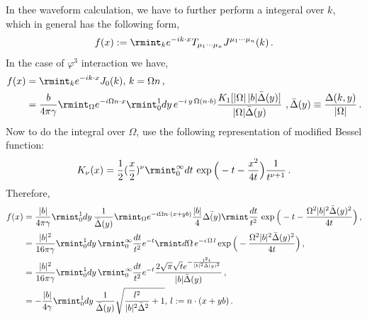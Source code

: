 In thee waveform calculation, we have to further  perform a integeral over $k$, which in general has the following form,
\begin{align}
    \begin{split}
        f(x):=\rmint_{k}e^{-ik\cdot x}T_{\mu_1\cdots \mu_n}J^{\mu_1\cdots \mu_n}(k)\,.
    \end{split}
\end{align}
In the case of $\varphi^3$ interaction we have,
\begin{align}
    \begin{split}
        f(x)&=\rmint_{k}e^{-ik\cdot x}J_{0}(k), \,k=\Omega n\,,\\ &
        =\frac{b}{4\pi\gamma}\rmint_{\Omega}e^{-i\Omega n\cdot x}\rmint_{0}^1 dy\,e^{-i\,y\,\Omega(n\cdot b)}\frac{K_1[|\Omega|\,|b|\bar\Delta(y)]}{|\Omega|\bar\Delta(y)}\,\,,\bar\Delta(y)\equiv\frac{\Delta(k,y)}{|\Omega|}\,.\label{ch2:A.6}
    \end{split}
\end{align}
Now to do the integral over $\Omega$, use the following representation of modified Bessel function:
\begin{align}
    \begin{split}
        K_{\nu}(x)=\frac{1}{2}(\frac{x}{2})^{\nu}\rmint_{0}^{\infty}dt\,\exp\Big(-t-\frac{x^2}{4t}\Big)\frac{1}{t^{\nu+1}}\,.
    \end{split}
\end{align}
Therefore,
\begin{align}
    \begin{split}
        f(x)&=\frac{|b|}{4\pi\gamma}\rmint_{0}^{1}dy\, \frac{1}{\Bar\Delta(y)}\rmint_{\Omega}e^{-i\Omega n\cdot(x+yb)}\frac{|b|}{4}\Bar{\Delta(y)}\rmint \frac{dt}{t^2}\,\exp\Big(-t-\frac{\Omega^2|b|^2\bar\Delta(y)^2}{4t}\Big)\,,\\ &
        =\frac{|b|^2}{16\pi\gamma}\rmint_{0}^{1}dy\, \rmint_{0}^{\infty} \frac{dt}{t^2}e^{-t}\rmint d\Omega\,e^{-i\,\Omega\, l}\exp\Big(-\frac{\Omega^2|b|^2\bar\Delta(y)^2}{4t}\Big)\,,\\ &
         =\frac{|b|^2}{16\pi\gamma}\rmint_{0}^{1}dy\, \rmint_{0}^{\infty} \frac{dt}{t^2}e^{-t}\frac{2 \sqrt{\pi } \sqrt{t} e^{-\frac{l^2 t}{|b|^2 \bar\Delta(y) ^2}}}{|b| \bar\Delta(y) }\,,\\ &
          =-\frac{|b|}{4\gamma}\rmint_{0}^{1}dy\,\frac{1}{\Bar\Delta(y)}\sqrt{\frac{l^2}{|b|^2\bar\Delta^2}+1},\,l:=n\cdot(x+yb)\,.\label{A.8}
    \end{split}
\end{align}
